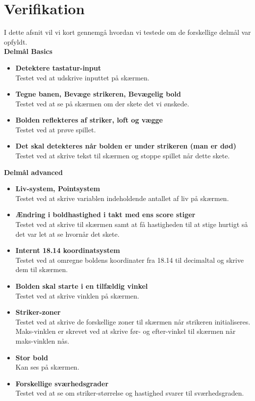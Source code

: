 \chapter{Verifikation}

I dette afsnit vil vi kort gennemgå hvordan vi testede om de forskellige delmål var opfyldt. \\


\textbf{Delmål Basics}
\begin{itemize}
\item \textbf{Detektere tastatur-input }
\\ Testet ved at udskrive inputtet på skærmen.
\item \textbf{Tegne banen, Bevæge strikeren, Bevægelig bold}
\\ Testet ved at se på skærmen om der skete det vi ønskede.

\item \textbf{Bolden reflekteres af striker, loft og vægge}
\\ Testet ved at prøve spillet.
\item \textbf{Det skal detekteres når bolden er under strikeren (man er død)}
\\ Testet ved at skrive tekst til skærmen og stoppe spillet når dette skete.
\end{itemize}

\textbf{Delmål advanced}
\begin{itemize}
\item \textbf{Liv-system, Pointsystem}
\\ Testet ved at skrive variablen indeholdende antallet af liv på skærmen.

\item \textbf{Ændring i boldhastighed i takt med ens score stiger}
\\ Testet ved at skrive til skærmen samt at få hastigheden til at stige hurtigt så det var let at se hvornår det skete.

\item \textbf{Internt 18.14 koordinatsystem}
\\ Testet ved at omregne boldens koordinater fra 18.14 til decimaltal og skrive dem til skærmen.
\item \textbf{Bolden skal starte i en tilfældig vinkel}
\\ Testet ved at skrive vinklen på skærmen.
\item \textbf{Striker-zoner}
\\ Testet ved at skrive de forskellige zoner til skærmen når strikeren initialiseres. Maks-vinklen er skrevet ved at skrive før- og efter-vinkel til skærmen når maks-vinklen nås. 
\item \textbf{Stor bold}
\\ Kan ses på skærmen.
\item \textbf{Forskellige sværhedsgrader}
\\ Testet ved at se om striker-størrelse og hastighed svarer til sværhedsgraden.

\end{itemize}	

